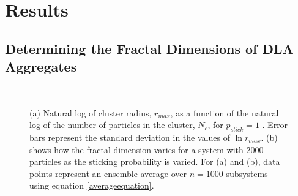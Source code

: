 \documentclass[11pt]{iopart}
\begin{document}
\section{Results}

\subsection{Determining the Fractal Dimensions of DLA Aggregates}

\begin{figure}[t]
    \centering
     \\
 
    \caption{(a) Natural log of cluster radius, $r_{max}$, as a function of the natural log of the number of particles in the cluster, $N_c$, for $p_{stick} = 1$ . Error bars represent the standard deviation in the values of $\ln r_{max}$. (b) shows how the fractal dimension varies for a system with 2000 particles as the sticking probability is varied. For (a) and (b), data points represent an ensemble average over $n=1000$ subsystems using equation \ref{averageequation}.}
        \label{fig:loggraph}
        \label{fig:stickinggraph}
\end{figure}
\end{document}
